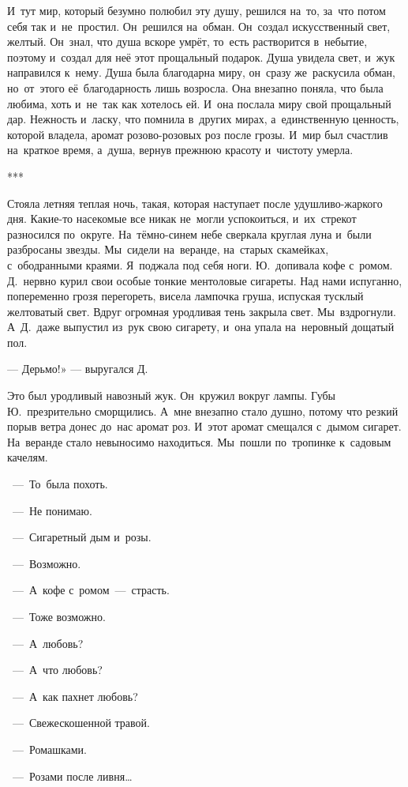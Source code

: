 И~тут мир, который безумно полюбил эту душу, решился на~то, за~что потом себя так и~не~простил.
Он~решился на~обман.
Он~создал искусственный свет, желтый.
Он~знал, что душа вскоре умрёт, то~есть растворится в~небытие, поэтому и~создал для неё этот прощальный подарок.
Душа увидела свет, и~жук направился к~нему.
Душа была благодарна миру, он~сразу же~раскусила обман, но~от~этого её~благодарность лишь возросла.
Она внезапно поняла, что была любима, хоть и~не~так как хотелось ей.
И~она послала миру свой прощальный дар.
Нежность и~ласку, что помнила в~других мирах, а~единственную ценность, которой владела, аромат розово-розовых роз после грозы.
И~мир был счастлив на~краткое время, а~душа, вернув прежнюю красоту и~чистоту умерла.
\begin{center}
***
\end{center}
Стояла летняя теплая ночь, такая, которая наступает после удушливо-жаркого дня.
Какие-то насекомые все никак не~могли успокоиться, и~их~стрекот разносился по~округе.
На~тёмно-синем небе сверкала круглая луна и~были разбросаны звезды.
Мы~сидели на~веранде, на~старых скамейках, с~ободранными краями.
Я~поджала под себя ноги.
Ю.~допивала кофе с~ромом.
Д.~нервно курил свои особые тонкие ментоловые сигареты.
Над нами испуганно, попеременно грозя перегореть, висела лампочка груша, испуская тусклый желтоватый свет.
Вдруг огромная уродливая тень закрыла свет.
Мы~вздрогнули.
А~Д.~даже выпустил из~рук свою сигарету, и~она упала на~неровный дощатый пол.

 --- Дерьмо!» --- выругался Д.

Это был уродливый навозный жук.
Он~кружил вокруг лампы.
Губы Ю.~презрительно сморщились.
А~мне внезапно стало душно, потому что резкий порыв ветра донес до~нас аромат роз.
И~этот аромат смещался с~дымом сигарет.
На~веранде стало невыносимо находиться.
Мы~пошли по~тропинке к~садовым качелям.
 
~---~То~была похоть.
 
~---~Не понимаю.
 
~---~Сигаретный дым и~розы.
 
~---~Возможно.
 
~---~А~кофе с~ромом~---~страсть.
 
~---~Тоже возможно.
 
~---~А~любовь?
 
~---~А~что любовь?
 
~---~А~как пахнет любовь?
 
~---~Свежескошенной травой.
 
~---~Ромашками.
 
~---~Розами после ливня… 
